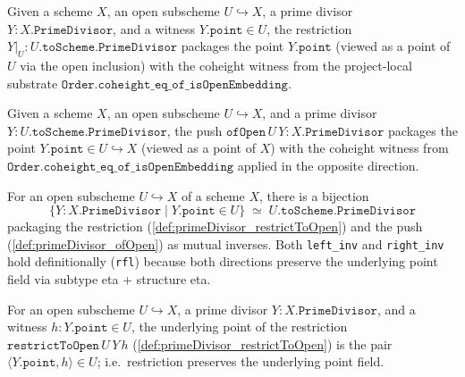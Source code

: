 \begin{definition}

  \label{def:primeDivisor_restrictToOpen}
  Given a scheme \(X\), an open subscheme \(U \hookrightarrow X\), a prime
  divisor \(Y : X.\texttt{PrimeDivisor}\), and a witness \(Y.\texttt{point} \in U\),
  the restriction \(Y |_U : U.\texttt{toScheme}.\texttt{PrimeDivisor}\) packages
  the point \(Y.\texttt{point}\) (viewed as a point of \(U\) via the open
  inclusion) with the coheight witness from the project-local substrate
  \(\texttt{Order.coheight\_eq\_of\_isOpenEmbedding}\).
\end{definition}
\begin{definition}

  \label{def:primeDivisor_ofOpen}
  Given a scheme \(X\), an open subscheme \(U \hookrightarrow X\), and a
  prime divisor \(Y : U.\texttt{toScheme}.\texttt{PrimeDivisor}\), the push
  \(\texttt{ofOpen}\,U\,Y : X.\texttt{PrimeDivisor}\) packages the point
  \(Y.\texttt{point} \in U \hookrightarrow X\) (viewed as a point of \(X\))
  with the coheight witness from
  \(\texttt{Order.coheight\_eq\_of\_isOpenEmbedding}\) applied in the
  opposite direction.
\end{definition}
\begin{lemma}

  \label{lem:primeDivisor_equivOpen}
  For an open subscheme \(U \hookrightarrow X\) of a scheme \(X\), there is a
  bijection
  \[
    \{Y : X.\texttt{PrimeDivisor} \mid Y.\texttt{point} \in U\}
    \;\simeq\;
    U.\texttt{toScheme}.\texttt{PrimeDivisor}
  \]
  packaging the restriction (\ref{def:primeDivisor_restrictToOpen}) and the
  push (\ref{def:primeDivisor_ofOpen}) as mutual inverses. Both
  \texttt{left\_inv} and \texttt{right\_inv} hold definitionally
  (\texttt{rfl}) because both directions preserve the underlying point
  field via subtype eta + structure eta.
\end{lemma}
\begin{lemma}

  \label{lem:primeDivisor_restrictToOpen_point}
  For an open subscheme \(U \hookrightarrow X\), a prime divisor
  \(Y : X.\texttt{PrimeDivisor}\), and a witness \(h : Y.\texttt{point} \in U\),
  the underlying point of the restriction
  \(\texttt{restrictToOpen}\,U\,Y\,h\) (\ref{def:primeDivisor_restrictToOpen})
  is the pair \(\langle Y.\texttt{point}, h\rangle \in U\); i.e.\ restriction
  preserves the underlying point field.
\end{lemma}
